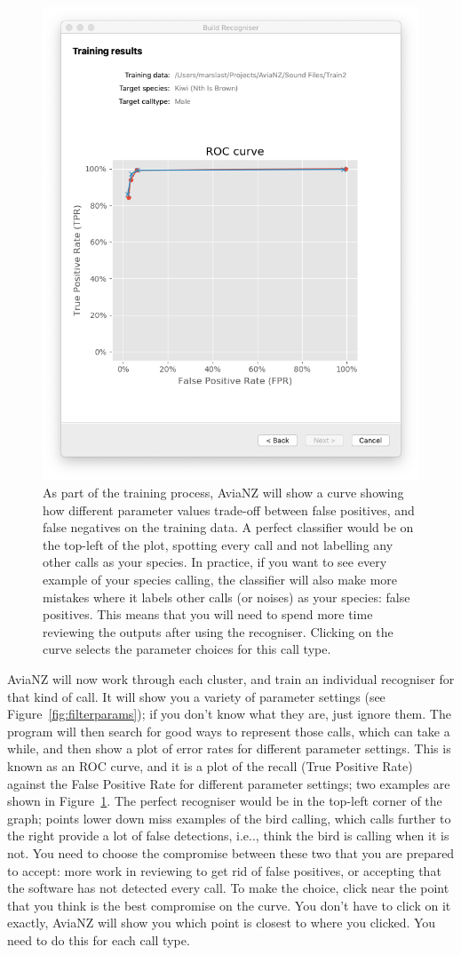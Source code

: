\documentclass{article}
\begin{document}
        \begin{figure}[h]
    \centering
    \includegraphics[width=.4\textwidth]{Figs/Wizard_ROC}
    \caption{As part of the training process, AviaNZ will show a curve showing how different parameter values trade-off between false positives, and false negatives on the training data. A perfect classifier would be on the top-left of the plot, spotting every call and not labelling any other calls as your species. In practice, if you want to see every example of your species calling, the classifier will also make more mistakes where it labels other calls (or noises) as your species: false positives. This means that you will need to spend more time reviewing the outputs after using the recogniser. Clicking on the curve selects the parameter choices for this call type.}
    \label{fig:ROC}
    \end{figure}
    
AviaNZ will now work through each cluster, and train an individual recogniser for that kind of call. It will show you a variety of parameter settings (see Figure~\ref{fig:filterparams}); if you don't know what they are, just ignore them. The program will then search for good ways to represent those calls, which can take a while, and then show a plot of error rates for different parameter settings. This is known as an ROC curve, and it is a plot of the recall (True Positive Rate) against the False Positive Rate for different parameter settings; two examples are shown in Figure~\ref{fig:ROC}. The perfect recogniser would be in the top-left corner of the graph; points lower down miss examples of the bird calling, which calls further to the right provide a lot of false detections, i.e.., think the bird is calling when it is not. You need to choose the compromise between these two that you are prepared to accept: more work in reviewing to get rid of false positives, or accepting that the software has not detected every call. To make the choice, click near the point that you think is the best compromise on the curve. You don't have to click on it exactly, AviaNZ will show you which point is closest to where you clicked. You need to do this for each call type. 
\end{document}
